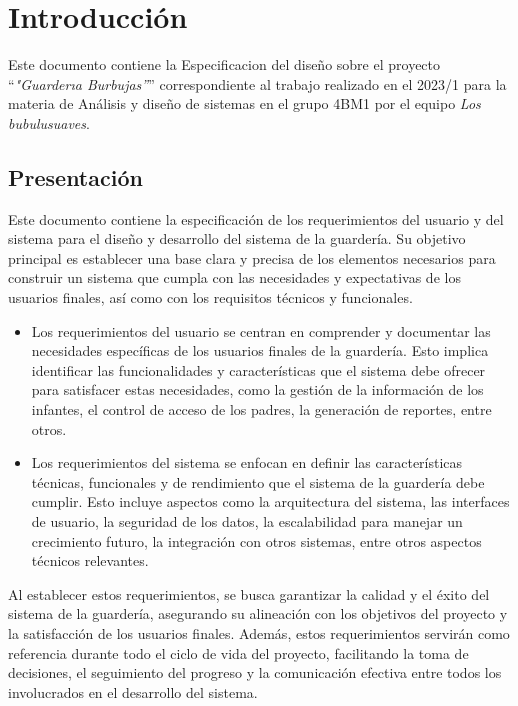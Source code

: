 \chapter{Introducción}

	Este documento contiene la Especificacion del diseño sobre el proyecto ``{\em "Guarderıa Burbujas”}'' correspondiente al trabajo realizado en el 2023/1 para la materia de Análisis y diseño de sistemas en el grupo 4BM1 por el equipo {\em Los bubulusuaves}.

\section{Presentación}

Este documento contiene la especificación de los requerimientos del usuario y del sistema para el diseño y desarrollo del sistema de la guardería. Su objetivo principal es establecer una base clara y precisa de los elementos necesarios para construir un sistema que cumpla con las necesidades y expectativas de los usuarios finales, así como con los requisitos técnicos y funcionales.

\begin{itemize}
\item Los requerimientos del usuario se centran en comprender y documentar las necesidades específicas de los usuarios finales de la guardería. Esto implica identificar las funcionalidades y características que el sistema debe ofrecer para satisfacer estas necesidades, como la gestión de la información de los infantes, el control de acceso de los padres, la generación de reportes, entre otros.


\item Los requerimientos del sistema se enfocan en definir las características técnicas, funcionales y de rendimiento que el sistema de la guardería debe cumplir. Esto incluye aspectos como la arquitectura del sistema, las interfaces de usuario, la seguridad de los datos, la escalabilidad para manejar un crecimiento futuro, la integración con otros sistemas, entre otros aspectos técnicos relevantes.
\end{itemize}

Al establecer estos requerimientos, se busca garantizar la calidad y el éxito del sistema de la guardería, asegurando su alineación con los objetivos del proyecto y la satisfacción de los usuarios finales. Además, estos requerimientos servirán como referencia durante todo el ciclo de vida del proyecto, facilitando la toma de decisiones, el seguimiento del progreso y la comunicación efectiva entre todos los involucrados en el desarrollo del sistema.

